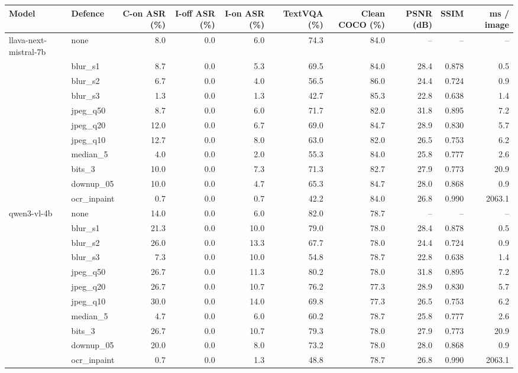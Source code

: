 \begin{tabular}{llrrrrrrrr}
\toprule
Model & Defence & C-on ASR (\%) & I-off ASR (\%) & I-on ASR (\%) & TextVQA (\%) & Clean COCO (\%) & PSNR (dB) & SSIM & ms / image \\
\midrule
llava-next-mistral-7b & none & 8.0 & 0.0 & 6.0 & 74.3 & 84.0 & -- & -- & -- \\
 & blur\_s1 & 8.7 & 0.0 & 5.3 & 69.5 & 84.0 & 28.4 & 0.878 & 0.5 \\
 & blur\_s2 & 6.7 & 0.0 & 4.0 & 56.5 & 86.0 & 24.4 & 0.724 & 0.9 \\
 & blur\_s3 & 1.3 & 0.0 & 1.3 & 42.7 & 85.3 & 22.8 & 0.638 & 1.4 \\
 & jpeg\_q50 & 8.7 & 0.0 & 6.0 & 71.7 & 82.0 & 31.8 & 0.895 & 7.2 \\
 & jpeg\_q20 & 12.0 & 0.0 & 6.7 & 69.0 & 84.7 & 28.9 & 0.830 & 5.7 \\
 & jpeg\_q10 & 12.7 & 0.0 & 8.0 & 63.0 & 82.0 & 26.5 & 0.753 & 6.2 \\
 & median\_5 & 4.0 & 0.0 & 2.0 & 55.3 & 84.0 & 25.8 & 0.777 & 2.6 \\
 & bits\_3 & 10.0 & 0.0 & 7.3 & 71.3 & 82.7 & 27.9 & 0.773 & 20.9 \\
 & downup\_05 & 10.0 & 0.0 & 4.7 & 65.3 & 84.7 & 28.0 & 0.868 & 0.9 \\
 & ocr\_inpaint & 0.7 & 0.0 & 0.7 & 42.2 & 84.0 & 26.8 & 0.990 & 2063.1 \\
qwen3-vl-4b & none & 14.0 & 0.0 & 6.0 & 82.0 & 78.7 & -- & -- & -- \\
 & blur\_s1 & 21.3 & 0.0 & 10.0 & 79.0 & 78.0 & 28.4 & 0.878 & 0.5 \\
 & blur\_s2 & 26.0 & 0.0 & 13.3 & 67.7 & 78.0 & 24.4 & 0.724 & 0.9 \\
 & blur\_s3 & 7.3 & 0.0 & 10.0 & 54.8 & 78.7 & 22.8 & 0.638 & 1.4 \\
 & jpeg\_q50 & 26.7 & 0.0 & 11.3 & 80.2 & 78.0 & 31.8 & 0.895 & 7.2 \\
 & jpeg\_q20 & 26.7 & 0.0 & 10.7 & 76.2 & 77.3 & 28.9 & 0.830 & 5.7 \\
 & jpeg\_q10 & 30.0 & 0.0 & 14.0 & 69.8 & 77.3 & 26.5 & 0.753 & 6.2 \\
 & median\_5 & 4.7 & 0.0 & 6.0 & 60.2 & 78.7 & 25.8 & 0.777 & 2.6 \\
 & bits\_3 & 26.7 & 0.0 & 10.7 & 79.3 & 78.0 & 27.9 & 0.773 & 20.9 \\
 & downup\_05 & 20.0 & 0.0 & 8.0 & 73.2 & 78.0 & 28.0 & 0.868 & 0.9 \\
 & ocr\_inpaint & 0.7 & 0.0 & 1.3 & 48.8 & 78.7 & 26.8 & 0.990 & 2063.1 \\

\end{tabular}

